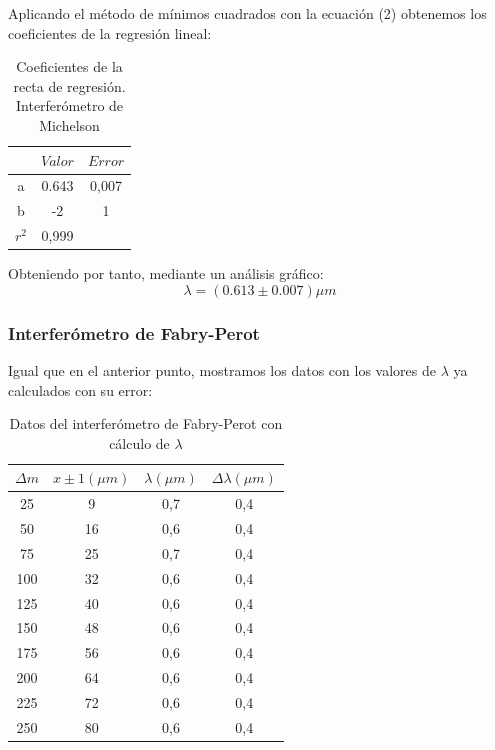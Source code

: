\documentclass[11pt,letterpaper,twocolumn]{article}
\begin{document}
Aplicando el método de mínimos cuadrados con la ecuación (2) obtenemos los coeficientes de la regresión lineal:
\begin{table}[H]
    \centering
    \begin{tabular}{|c|c|c|}
        \hline
         & $Valor$ & $Error$  \\ \hline
        a & 0.643 & 0,007 \\ \hline
        b & -2 & 1 \\ \hline
        $r^2$ & 0,999 &  \\ \hline
    \end{tabular}
    \label{}
    \caption{Coeficientes de la recta de regresión. Interferómetro de Michelson}
\end{table}
Obteniendo por tanto, mediante un análisis gráfico:
\begin{equation}
    \boxed{\lambda= \left( 0.613 \pm 0.007  \right) \mu m}
\end{equation}


\subsubsection{Interferómetro de Fabry-Perot}
Igual que en el anterior punto, mostramos los datos con los valores de $\lambda$ ya calculados con su error:
\begin{table}[H]
    \centering
    \begin{tabular}{|c|c|c|c|}
        \hline
        $\Delta m $ &$x \pm 1 \left( \mu m \right) $  & $\lambda \left( \mu m \right) $ & $\Delta \lambda \left( \mu m \right) $ \\ \hline
        25 & 9  & 0,7 & 0,4 \\ \hline
        50 & 16  & 0,6 & 0,4 \\ \hline
        75 & 25  & 0,7 & 0,4 \\ \hline
        100 & 32 & 0,6 & 0,4 \\ \hline
        125 & 40  & 0,6 & 0,4 \\ \hline
        150 & 48 & 0,6 & 0,4 \\ \hline
        175 & 56 & 0,6 & 0,4 \\ \hline
        200 & 64  & 0,6 & 0,4 \\ \hline
        225 & 72  & 0,6 & 0,4 \\ \hline
        250 & 80  & 0,6 & 0,4 \\ \hline
    \end{tabular}
    \label{}
    \caption{Datos del interferómetro de Fabry-Perot con cálculo de $\lambda$}
\end{table}
\end{document}
